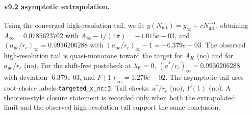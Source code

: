 \paragraph{v9.2 asymptotic extrapolation.}
Using the converged high-resolution tail, we fit $y(N_{\mathrm{int}})=y_{\infty}+cN_{\mathrm{int}}^{-\alpha}$, obtaining $A_\infty=0.0785623702$ with $A_\infty-1/(4\pi)=-1.015e-03$, and $(a_{\mathrm{nc}}/r_c)_\infty=0.9936206288$ with $(a_{\mathrm{nc}}/r_c)_\infty-1=-6.379e-03$. The observed high-resolution tail is quasi-monotone toward the target for $A_K$ (no) and for $a_{\mathrm{nc}}/r_c$ (no). For the shift-free postcheck at $\lambda_K=0$, $(a^*/r_c)_\infty=0.9936206288$ with deviation -6.379e-03, and $F(1)_\infty=1.276e-02$. The asymptotic tail uses root-choice labels \texttt{targeted_x_nc:3}. Tail checks: $a^*/r_c$ (no), $F(1)$ (no). A theorem-style closure statement is recorded only when both the extrapolated limit and the
observed high-resolution tail support the same conclusion.
